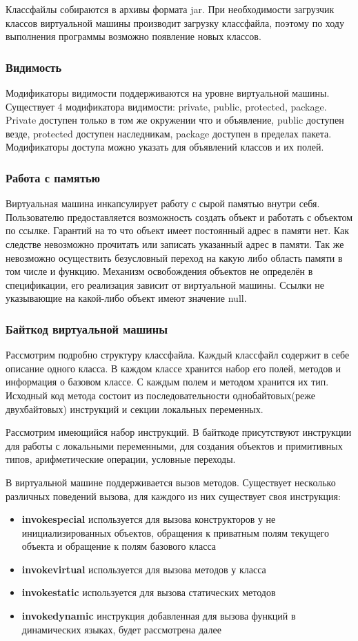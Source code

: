 Классфайлы собираются в архивы формата jar. При необходимости загрузчик классов виртуальной машины производит загрузку классфайла, поэтому по ходу выполнения программы возможно появление новых классов.

\subsubsection{Видимость}
Модификаторы видимости поддерживаются на уровне виртуальной машины. Существует 4 модификатора видимости: private, public, protected, package. Private доступен только в том же окружении что и объявление, public доступен везде, protected доступен наследникам, package доступен в пределах пакета. Модификаторы доступа можно указать для объявлений классов и их полей.

\subsubsection{Работа с памятью}
Виртуальная машина инкапсулирует работу с сырой памятью внутри себя. Пользователю предоставляется возможность создать объект и работать с объектом по ссылке. Гарантий на то что объект имеет постоянный адрес в памяти нет. Как следстве невозможно прочитать или записать указанный адрес в памяти. Так же невозможно осуществить безусловный переход на какую либо область памяти в том числе и функцию. Механизм освобождения объектов не определён в спецификации, его реализация зависит от виртуальной машины. Ссылки не указывающие на какой-либо объект имеют значение null.

\subsubsection{Байткод виртуальной машины}
Рассмотрим подробно структуру классфайла. Каждый классфайл содержит в себе описание одного класса. В каждом классе хранится набор его полей, методов и информация о базовом классе. С каждым полем и методом хранится их тип. Исходный код метода состоит из последовательности однобайтовых(реже двухбайтовых) инструкций и секции локальных переменных.

Рассмотрим имеющийся набор инструкций. В байткоде присутствуют инструкции для работы с локальными переменными, для создания объектов и примитивных типов, арифметические операции, условные переходы.

В виртуальной машине поддерживается вызов методов. Существует несколько различных поведений вызова, для каждого из них существует своя инструкция:
\begin{itemize}
    \item \textbf{invokespecial} используется для вызова конструкторов у не инициализированных объектов, обращения к приватным полям текущего объекта и обращение к полям базового класса
    \item \textbf{invokevirtual} используется для вызова методов у класса
    \item \textbf{invokestatic} используется для вызова статических методов
    \item \textbf{invokedynamic} инструкция добавленная для вызова функций в динамических языках, будет рассмотрена далее
\end{itemize}

